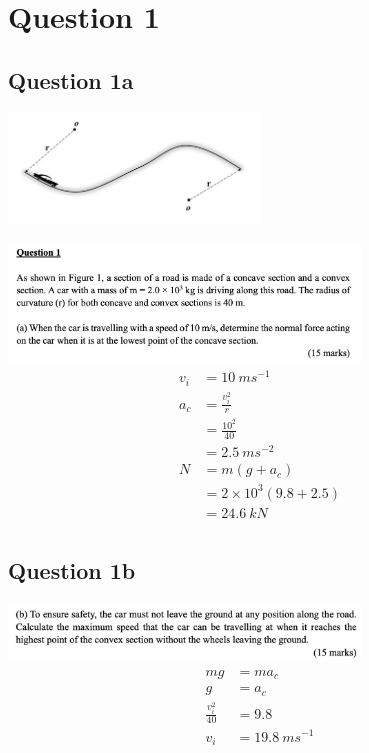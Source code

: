 \documentclass{article}
\begin{document}
\newcommand{\documentcourse}{ENGG1300}
\newcommand{\documentnumber}{4}




\centering
\section*{Question 1}
\subsection*{Question 1a}
\includegraphics[width=0.5\textwidth]{img/A4Fig1.jpg}

\includegraphics[width=0.7\textwidth]{img/A4Q1a.jpg}
\begin{align*}
    v_i & = 10\ ms^{-1}            \\
    a_c & = \frac{v_i^2}{r}        \\
        & = \frac{10^2}{40}        \\
        & = 2.5\ ms^{-2}           \\
    N   & = m(g + a_c)             \\
        & = 2\times10^3(9.8 + 2.5) \\
        & = 24.6\ kN               \\
\end{align*}
\subsection*{Question 1b}
\includegraphics[width=0.7\textwidth]{img/A4Q1b.jpg}
\begin{align*}
    mg               & = ma_c          \\
    g                & = a_c           \\
    \frac{v_i^2}{40} & = 9.8           \\
    v_i              & = 19.8\ ms^{-1} \\
\end{align*}
\end{document}
